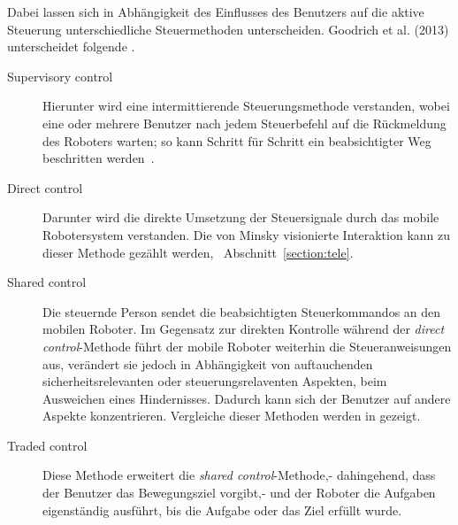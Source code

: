 

Dabei lassen sich in Abhängigkeit des Einflusses des Benutzers auf die aktive Steuerung unterschiedliche Steuermethoden unterscheiden. Goodrich et al. (2013) unterscheidet folgende \cite{Goodrich2013}.
\begin{description}
\item[Supervisory control] Hierunter wird eine intermittierende Steuerungsmethode verstanden, wobei eine oder mehrere Benutzer nach jedem Steuerbefehl auf die Rückmeldung des Roboters warten; so kann Schritt für Schritt ein beabsichtigter Weg beschritten werden~\cite{sheridan1992}.
\item[Direct control] Darunter wird die direkte Umsetzung der Steuersignale durch das mobile Robotersystem verstanden. Die von Minsky visionierte Interaktion kann zu dieser Methode gezählt werden, \vgl~Abschnitt~\ref{section:tele}. 
\item[Shared control] Die steuernde Person sendet die beabsichtigten Steuerkommandos an den mobilen Roboter. Im Gegensatz zur direkten Kontrolle während der \textit{direct control}-Methode führt der mobile Roboter weiterhin die Steueranweisungen aus, verändert sie jedoch in Abhängigkeit von  auftauchenden sicherheitsrelevanten oder steuerungsrelaventen Aspekten, \zB beim Ausweichen eines Hindernisses. Dadurch kann sich der Benutzer auf andere Aspekte konzentrieren. Vergleiche dieser Methoden werden in \cite{Baldo2015} gezeigt.
\item[Traded control] Diese Methode erweitert die \textit{shared control}-Methode,- dahingehend, dass der Benutzer das Bewegungsziel vorgibt,- und der Roboter die Aufgaben eigenständig ausführt, bis die Aufgabe oder das Ziel erfüllt wurde.
\end{description}

